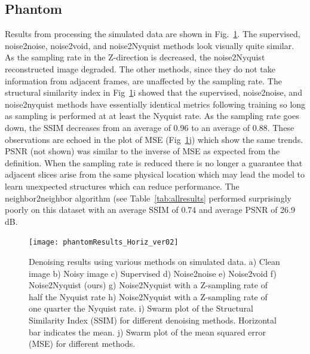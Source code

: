\documentclass[12pt]{spieman}
\begin{document}
\begin{spacing}{2}
\subsection{Phantom}
Results from processing the simulated data are shown in Fig.~\ref{fig:phantomResults}. The supervised, noise2noise, noise2void, and noise2Nyquist methods look visually quite similar. As the sampling rate in the Z-direction is decreased, the noise2Nyquist reconstructed image degraded. The other methods, since they do not take information from adjacent frames, are unaffected by the sampling rate. The structural similarity index in Fig~\ref{fig:phantomResults}i showed that the supervised, noise2noise, and noise2nyquist methods have essentially identical metrics following training so long as sampling is performed at at least the Nyquist rate. As the sampling rate goes down, the SSIM decreases from an average of 0.96 to an average of 0.88. These observations are echoed in the plot of MSE (Fig~\ref{fig:phantomResults}j) which show the same trends. PSNR (not shown) was similar to the inverse of MSE as expected from the definition. When the sampling rate is reduced there is no longer a guarantee that adjacent slices arise from the same physical location which may lead the model to learn unexpected structures which can reduce performance. The neighbor2neighbor algorithm (see Table~\ref{tab:allresults} performed surprisingly poorly on this dataset with an average SSIM of 0.74 and average PSNR of 26.9 dB.
\begin{figure}[htb]
	\begin{center}
		\texttt{[image: phantomResults\_Horiz\_ver02]}
		\caption{\label{fig:phantomResults}Denoising results using various methods on simulated data. a) Clean image b) Noisy image c) Supervised d) Noise2noise e) Noise2void f) Noise2Nyquist (ours) g) Noise2Nyquist with a Z-sampling rate of half the Nyquist rate h) Noise2Nyquist with a Z-sampling rate of one quarter the Nyquist rate. i) Swarm plot of the Structural Similarity Index (SSIM) for different denoising methods. Horizontal bar indicates the mean. j) Swarm plot of the mean squared error (MSE) for different methods.}
	\end{center}
\end{figure}


\end{spacing}
\end{document}
